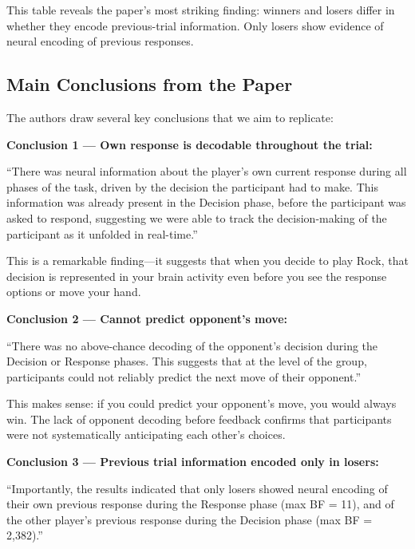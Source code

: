 \documentclass[11pt,a4paper]{article}
\begin{document}
This table reveals the paper's most striking finding: winners and losers differ in whether they encode previous-trial information. Only losers show evidence of neural encoding of previous responses.

\subsection{Main Conclusions from the Paper}
\label{subsec:paper_conclusions}

The authors draw several key conclusions that we aim to replicate:

\textbf{Conclusion 1 --- Own response is decodable throughout the trial:}
\begin{paperquote}
``There was neural information about the player's own current response during all phases of the task, driven by the decision the participant had to make. This information was already present in the Decision phase, before the participant was asked to respond, suggesting we were able to track the decision-making of the participant as it unfolded in real-time.''
\end{paperquote}

This is a remarkable finding---it suggests that when you decide to play Rock, that decision is represented in your brain activity even before you see the response options or move your hand.

\textbf{Conclusion 2 --- Cannot predict opponent's move:}
\begin{paperquote}
``There was no above-chance decoding of the opponent's decision during the Decision or Response phases. This suggests that at the level of the group, participants could not reliably predict the next move of their opponent.''
\end{paperquote}

This makes sense: if you could predict your opponent's move, you would always win. The lack of opponent decoding before feedback confirms that participants were not systematically anticipating each other's choices.

\textbf{Conclusion 3 --- Previous trial information encoded only in losers:}
\begin{paperquote}
``Importantly, the results indicated that only losers showed neural encoding of their own previous response during the Response phase (max BF = 11), and of the other player's previous response during the Decision phase (max BF = 2,382).''
\end{paperquote}
\end{document}

